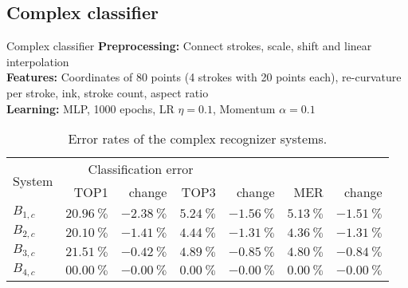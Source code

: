 \subsection{Complex classifier}
\begin{frame}{Complex classifier}
    \textbf{Preprocessing:} Connect strokes, scale, shift and linear interpolation\\
    \textbf{Features:} Coordinates of 80 points (4 strokes with 20 points each), re-curvature per stroke, ink, stroke count, aspect ratio\\
    \textbf{Learning:} MLP, 1000 epochs, LR $\eta=0.1$, Momentum $\alpha=0.1$
\begin{table}[htb]
    \centering
    \begin{tabular}{lrrrrrr}
    \toprule
    \multirow{2}{*}{System}  & \multicolumn{3}{c}{Classification error}\\ 
              & TOP1                   & change                 & TOP3                  & change                 & MER                   & change \\\midrule
    $B_{1,c}$ & $\SI{20.96}{\percent}$ & $\SI{-2.38}{\percent}$ & $\SI{5.24}{\percent}$ & $\SI{-1.56}{\percent}$ & $\SI{5.13}{\percent}$ & $\SI{-1.51}{\percent}$ \\
    $B_{2,c}$ & $\SI{20.10}{\percent}$ & $\SI{-1.41}{\percent}$ & $\SI{4.44}{\percent}$ & $\SI{-1.31}{\percent}$ & $\SI{4.36}{\percent}$ & $\SI{-1.31}{\percent}$ \\
    $B_{3,c}$ & $\SI{21.51}{\percent}$ & $\SI{-0.42}{\percent}$ & $\SI{4.89}{\percent}$ & $\SI{-0.85}{\percent}$ & $\SI{4.80}{\percent}$ & $\SI{-0.84}{\percent}$ \\
    $B_{4,c}$ & $\SI{00.00}{\percent}$ & $\SI{-0.00}{\percent}$ & $\SI{0.00}{\percent}$ & $\SI{-0.00}{\percent}$ & $\SI{0.00}{\percent}$ & $\SI{-0.00}{\percent}$ \\
    \bottomrule
    \end{tabular}
    \caption{Error rates of the complex recognizer systems.}
\label{table:complex-recognizer-systems-evaluation}
\end{table}
\end{frame}